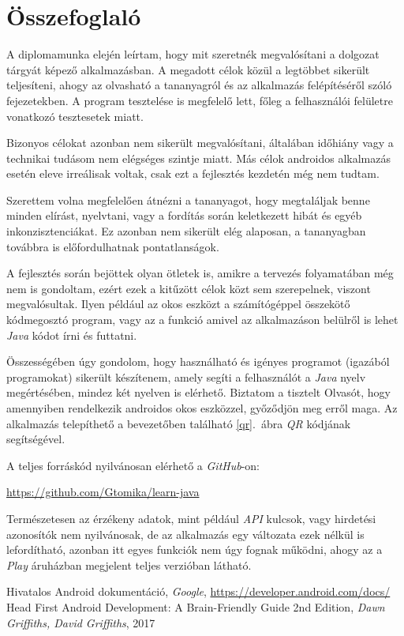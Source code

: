 \documentclass[12pt,a4paper]{article}
\begin{document}
	\section{Összefoglaló}\label{osszefoglalo}
	
	A diplomamunka elején leírtam, hogy mit szeretnék megvalósítani a dolgozat tárgyát képező alkalmazásban. A megadott célok közül a legtöbbet sikerült teljesíteni, ahogy az olvasható a tananyagról és az alkalmazás felépítéséről szóló fejezetekben. A program tesztelése is megfelelő lett, főleg a felhasználói felületre vonatkozó tesztesetek miatt.
	
	Bizonyos célokat azonban nem sikerült megvalósítani, általában időhiány vagy a technikai tudásom nem elégséges szintje miatt. Más célok androidos alkalmazás esetén eleve irreálisak voltak, csak ezt a fejlesztés kezdetén még nem tudtam.
	
	Szerettem volna megfelelően átnézni a tananyagot, hogy megtaláljak benne minden elírást, nyelvtani, vagy a fordítás során keletkezett hibát és egyéb inkonzisztenciákat. Ez azonban nem sikerült elég alaposan, a tananyagban továbbra is előfordulhatnak pontatlanságok.
	
	A fejlesztés során bejöttek olyan ötletek is, amikre a tervezés folyamatában még nem is gondoltam, ezért ezek a kitűzött célok közt sem szerepelnek, viszont megvalósultak. Ilyen például az okos eszközt a számítógéppel összekötő kódmegosztó program, vagy az a funkció amivel az alkalmazáson belülről is lehet \textit{Java} kódot írni és futtatni.
	
	Összességében úgy gondolom, hogy használható és igényes programot (igazából programokat) sikerült készítenem, amely segíti a felhasználót a \textit{Java} nyelv megértésében, mindez két nyelven is elérhető. Biztatom a tisztelt Olvasót, hogy amennyiben rendelkezik androidos okos eszközzel, győződjön meg erről maga. Az alkalmazás telepíthető a bevezetőben található \ref{qr}.\ ábra \textit{QR} kódjának segítségével.  
	
	A teljes forráskód nyilvánosan elérhető a \textit{GitHub}-on:
	
	\begin{center}
	 	\url{https://github.com/Gtomika/learn-java}
	\end{center}

	Természetesen az érzékeny adatok, mint például \textit{API} kulcsok, vagy hirdetési azonosítók nem nyilvánosak, de az alkalmazás egy változata ezek nélkül is lefordítható, azonban itt egyes funkciók nem úgy fognak működni, ahogy az a \textit{Play} áruházban megjelent teljes verzióban látható.
	
	\renewcommand\refname{Használt segédanyagok}
	\begin{thebibliography}{9}
		Hivatalos Android dokumentáció, \textit{Google}, \url{https://developer.android.com/docs/}
		Head First Android Development: A Brain-Friendly Guide 2nd Edition, \textit{Dawn Griffiths, David Griffiths}, 2017
	\end{thebibliography}
	
\end{document}
